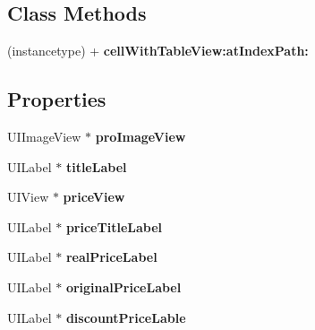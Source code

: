 \subsection*{Class Methods}
\begin{DoxyCompactItemize}
\item 
\mbox{\label{interface_f_n_buy_product_cell_a99f17be9de5dc1f116f6062c6391f30f}} 
(instancetype) + {\bfseries cell\+With\+Table\+View\+:at\+Index\+Path\+:}
\end{DoxyCompactItemize}
\subsection*{Properties}
\begin{DoxyCompactItemize}
\item 
\mbox{\label{interface_f_n_buy_product_cell_a54aec6ca1528889de7d85f7caac0c68c}} 
U\+I\+Image\+View $\ast$ {\bfseries pro\+Image\+View}
\item 
\mbox{\label{interface_f_n_buy_product_cell_ad7bc99f0a895ef50b2cf2ef190f38fa1}} 
U\+I\+Label $\ast$ {\bfseries title\+Label}
\item 
\mbox{\label{interface_f_n_buy_product_cell_ae51d66e50906069827df9469bf99415a}} 
U\+I\+View $\ast$ {\bfseries price\+View}
\item 
\mbox{\label{interface_f_n_buy_product_cell_a38ac44d792fcb3dc10ce5a0bc89a912d}} 
U\+I\+Label $\ast$ {\bfseries price\+Title\+Label}
\item 
\mbox{\label{interface_f_n_buy_product_cell_a0394e5cd18666e394b6eadb4c0372d8d}} 
U\+I\+Label $\ast$ {\bfseries real\+Price\+Label}
\item 
\mbox{\label{interface_f_n_buy_product_cell_a9d8023592a7ab3e055bd9de9f43f144d}} 
U\+I\+Label $\ast$ {\bfseries original\+Price\+Label}
\item 
\mbox{\label{interface_f_n_buy_product_cell_a81b83ae9df05347c0362ed225b8115a2}} 
U\+I\+Label $\ast$ {\bfseries discount\+Price\+Lable}

\end{DoxyCompactItemize}

